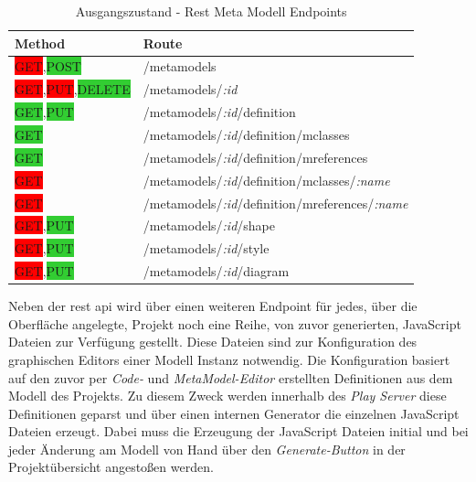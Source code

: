 \begin{table}[ht]
    \smallskip
    \centering
    \begin{tabular}{| l | l |}
    \hline
    \bf Method & \bf Route \\ \hline
    \colorbox{red}{GET},\colorbox{LimeGreen}{POST} & /metamodels \\ \hline
    \colorbox{red}{GET},\colorbox{red}{PUT},\colorbox{LimeGreen}{DELETE} & /metamodels/\emph{:id} \\ \hline
    \colorbox{LimeGreen}{GET},\colorbox{LimeGreen}{PUT} & /metamodels/\emph{:id}/definition \\ \hline
    \colorbox{LimeGreen}{GET} & /metamodels/\emph{:id}/definition/mclasses \\ \hline
    \colorbox{LimeGreen}{GET} & /metamodels/\emph{:id}/definition/mreferences \\ \hline
    \colorbox{red}{GET} & /metamodels/\emph{:id}/definition/mclasses/\emph{:name} \\ \hline
    \colorbox{red}{GET} & /metamodels/\emph{:id}/definition/mreferences/\emph{:name} \\ \hline
    \colorbox{red}{GET},\colorbox{LimeGreen}{PUT} & /metamodels/\emph{:id}/shape \\ \hline
    \colorbox{red}{GET},\colorbox{LimeGreen}{PUT} & /metamodels/\emph{:id}/style \\ \hline
    \colorbox{red}{GET},\colorbox{LimeGreen}{PUT} & /metamodels/\emph{:id}/diagram \\ \hline
    \end{tabular}
    \caption{Ausgangszustand - Rest Meta Modell Endpoints}
    \label{tab:ZETA_REST_META_MODEL_OLD}
\end{table}

Neben der \ac{rest} \ac{api} wird über einen weiteren Endpoint für jedes, über die Oberfläche angelegte, Projekt noch eine Reihe, von zuvor generierten, JavaScript Dateien zur Verfügung gestellt. Diese Dateien sind zur Konfiguration des graphischen Editors einer Modell Instanz notwendig. Die Konfiguration basiert auf den zuvor per \textit{Code-} und \textit{MetaModel-Editor} erstellten Definitionen aus dem Modell des Projekts. Zu diesem Zweck werden innerhalb des \textit{Play Server} diese Definitionen geparst und über einen internen Generator die einzelnen JavaScript Dateien erzeugt. Dabei muss die Erzeugung der JavaScript Dateien initial und bei jeder Änderung am Modell von Hand über den \textit{Generate-Button} in der Projektübersicht angestoßen werden.

